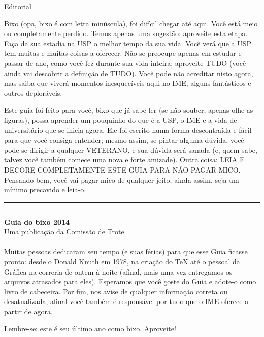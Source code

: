 \begin{secao}{Editorial}

Bixo (opa, bixo é com letra minúscula), foi difícil chegar até aqui. Você está
meio ou completamente perdido. Temos apenas uma sugestão: aproveite esta etapa.
Faça da sua estadia na USP o melhor tempo da sua vida. Você verá que a USP tem
muitas e muitas coisas a oferecer. Não se preocupe apenas em estudar e passar de
ano, como você fez durante sua vida inteira; aproveite TUDO (você ainda vai
descobrir a definição de TUDO). Você pode não acreditar nisto agora, mas saiba
que viverá momentos inesquecíveis aqui no IME, alguns fantásticos e outros deploráveis. 

Este guia foi feito para você, bixo que já sabe ler (se não souber, apenas olhe
as figuras), possa aprender um pouquinho do que é a USP, o IME e a vida de
universitário que se inicia agora. Ele foi escrito numa forma descontraída e
fácil para que você consiga entender; mesmo assim, se pintar alguma dúvida,
você pode se dirigir a qualquer VETERANO, e sua dúvida será sanada (e, quem sabe,
talvez você também comece uma nova e forte amizade). Outra coisa: LEIA E DECORE
COMPLETAMENTE ESTE GUIA PARA NÃO PAGAR MICO. Pensando bem, você vai pagar mico
de qualquer jeito; ainda assim, seja um mínimo precavido e leia-o.

\rule{\textwidth}{0.5ex}\rule{2ex}{0.5ex}



{\large\bf Guia do bixo 2014} \\
Uma publicação da Comissão de Trote

\paragraph{}
Muitas pessoas dedicaram seu tempo (e suas férias) para que esse Guia ficasse pronto: desde o
Donald Knuth em 1978, na criação do \TeX\makebox{} até o pessoal da Gráfica na correria de
ontem à noite (afinal, mais uma vez entregamos os arquivos atrasados para eles).
Esperamos que você goste do Guia e adote-o como livro de cabeceira. Por fim,
nos avise de qualquer informação correta ou desatualizada, afinal você também é
responsável por tudo que o IME oferece a partir de agora.

Lembre-se: este é seu último ano como bixo. Aproveite!


\end{secao}
